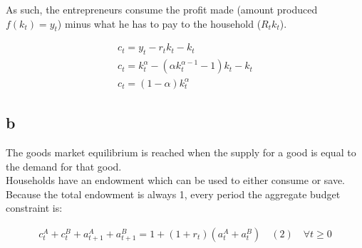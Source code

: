 \documentclass{article}
\begin{document}
As such, the entrepreneurs consume the profit made (amount produced $f(k_t)=y_t$) minus what he has to pay to the household ($R_tk_t$). 

\begin{gather*}
    c_t=y_t-r_tk_t-k_t\\
    c_t=k_t^{\alpha}-(\alpha k_t^{\alpha-1}-1)k_t -k_t \\
    c_t=(1-\alpha)k_t^{\alpha}
\end{gather*}

\subsection{b}

The goods market equilibrium is reached when the supply for a good is equal to the demand for that good. \\

Households have an endowment which can be used to either consume or save.\\
Because the total endowment is always 1, every period the aggregate budget constraint is:

\begin{gather*}
    c_t^A+c_t^B+a_{t+1}^A+a_{t+1}^B=1+(1+r_t)(a_t^A+a_t^B)\quad(2)\quad\forall t\geq 0
\end{gather*}
\end{document}
